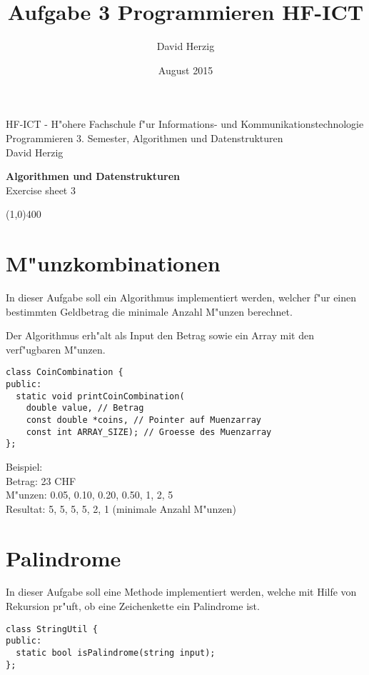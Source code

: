 \documentclass[a4paper,10pt]{article}
\title{Aufgabe 3 Programmieren HF-ICT}
\author{David Herzig}
\date{August 2015}
\begin{document}
HF-ICT - H"ohere Fachschule f"ur Informations- und Kommunikationstechnologie\\
Programmieren 3. Semester, Algorithmen und Datenstrukturen\\
David Herzig

\vspace{2mm}

\begin{center}
{\Large \bf Algorithmen und Datenstrukturen}\\
Exercise sheet 3
\end{center}

\vspace{2mm}

\line(1,0){400}

\vspace{5mm}

\section{M"unzkombinationen}
In dieser Aufgabe soll ein Algorithmus implementiert werden, welcher
f"ur einen bestimmten Geldbetrag die minimale Anzahl M"unzen berechnet.

\vspace{3mm}

Der Algorithmus erh"alt als Input den Betrag sowie ein Array mit den 
verf"ugbaren M"unzen.

\begin{lstlisting}
class CoinCombination {
public:
  static void printCoinCombination(
    double value, // Betrag
    const double *coins, // Pointer auf Muenzarray
    const int ARRAY_SIZE); // Groesse des Muenzarray
};
\end{lstlisting}

Beispiel:\\
Betrag: 23 CHF\\
M"unzen: {0.05, 0.10, 0.20, 0.50, 1, 2, 5}\\
Resultat: 5, 5, 5, 5, 2, 1 (minimale Anzahl M"unzen) 

\section{Palindrome}
In dieser Aufgabe soll eine Methode implementiert werden, welche mit Hilfe von Rekursion pr"uft,
ob eine Zeichenkette ein Palindrome ist.

\vspace{3mm}

\begin{lstlisting}
class StringUtil {
public:
  static bool isPalindrome(string input);
};
\end{lstlisting}
\end{document}
